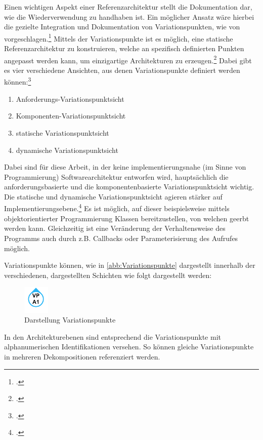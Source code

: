 Einen wichtigen Aspekt einer Referenzarchitektur stellt die Dokumentation dar, wie die Wiederverwendung zu handhaben ist. Ein möglicher Ansatz wäre hierbei die gezielte Integration und Dokumentation von Variationspunkten, wie von \citeauthor{Webber.2001} vorgeschlagen.\footcite[Vgl.][24\psqq]{Webber.2001} Mittels der Variationspunkte ist es möglich, eine statische Referenzarchitektur zu konstruieren, welche an spezifisch definierten Punkten angepasst werden kann, um einzigartige Architekturen zu erzeugen.\footcite[Vgl.][24]{Webber.2001} Dabei gibt es vier verschiedene Ansichten, aus denen Variationspunkte definiert werden können:\footcite[Vgl.][25\psq]{Webber.2001}
\begin{enumerate}
\item \label{view:first} Anforderungs-Variationspunktsicht 
\item \label{view:second} Komponenten-Variationspunktsicht 
\item \label{view:third} statische Variationspunktsicht 
\item \label{view:fourth} dynamische Variationspunktsicht
\end{enumerate}
Dabei sind für diese Arbeit, in der keine implementierungsnahe (im Sinne von Programmierung) Softwarearchitektur entworfen wird, hauptsächlich die anforderungsbasierte und die komponentenbasierte Variationspunktsicht wichtig. Die statische und dynamische Variationspunktsicht agieren stärker auf Implementierungsebene.\footcite[Vgl. auch im Folgenden][25\psq]{Webber.2001} Es ist möglich, auf dieser beispielsweise mittels objektorientierter Programmierung Klassen bereitzustellen, von welchen geerbt werden kann. Gleichzeitig ist eine Veränderung der Verhaltensweise des Programms auch durch z.B. Callbacks oder Parameterisierung des Aufrufes möglich.


Variationspunkte können, wie in \autoref{abb:Variationspunkte} dargestellt innerhalb der verschiedenen, dargestellten Schichten wie folgt dargestellt werden:
\begin{figure}[H]
\centering
\includegraphics[height=1.33cm]{graphics/Variationpoints.pdf}
\caption{Darstellung Variationspunkte}
\label{abb:Variationspunkte}
\end{figure}
In den Architekturebenen sind entsprechend die Variationspunkte mit alphanumerischen Identifikationen versehen. So können gleiche Variationspunkte in mehreren Dekompositionen referenziert werden.


